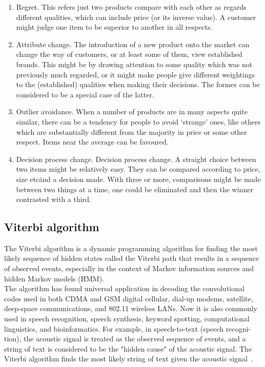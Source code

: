 \begin{enumerate}
	\item Regret.
	This refers just two products compare with each other as regards different qualities, which can include price (or its inverse value).
	A customer might judge one item to be superior to another in all respects.
	\item Attribute change.
	The introduction of a new product onto the market can change the way of customers, or at least some of them, view established brands.
	This might be by drawing attention to some quality which was not previously much regarded, or it might make people give different
	weightings to the (established) qualities when making their decisions. The former can be considered to be a special case of the latter.
	\item Outlier avoidance.
	When a number of products are in many aspects quite similar, there can be a tendency for people to avoid ‘strange’ ones,
	like others which are substantially different from the majority in price or some other respect.
	Items near the average can be favoured.
	\item Decision process change.
	Decision process change.
	A straight choice between two items might be relatively easy.
	They can be compared according to price, size etc\. and a decision made. With three or more,
	comparisons might be made between two things at a time, one could be eliminated and then the winner contrasted with a third.
\end{enumerate}
\subsection{Viterbi algorithm} \label{subsec:viterbi}
The Viterbi algorithm is a dynamic programming algorithm for finding the most likely sequence of hidden states called
the Viterbi path that results in a sequence of observed events, especially in the context of Markov information
sources and hidden Markov models (HMM).\\
The algorithm has found universal application in decoding the convolutional codes used in both CDMA and GSM digital cellular,
dial-up modems, satellite, deep-space communications, and 802.11 wireless LANs.
Now it is also commonly used in speech recognition, speech synthesis, keyword spotting, computational linguistics, and bioinformatics.
For example, in speech-to-text (speech recogni- tion), the acoustic signal is treated as the observed sequence of events, and a string of text is considered
to be the "hidden cause" of the acoustic signal.
The Viterbi algorithm finds the most likely string of text given the acoustic signal~\cite{DBLP:journals/corr/abs-cs-0504020}. \\

